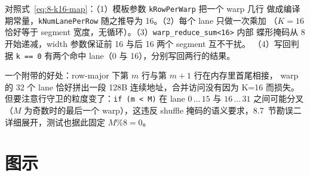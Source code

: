 

对照式~\ref{eq:8-k16-map}：（1）模板参数 \texttt{kRowPerWarp} 把一个 warp 几行
做成编译期常量，\texttt{k\allowbreak{}Num\allowbreak{}Lane\allowbreak{}Per\allowbreak{}Row} 随之推导为 16。（2）每个 lane 只做一次乘加
（$K=16$ 恰好等于 segment 宽度，无循环）。（3）\texttt{warp\_\allowbreak{}reduce\_\allowbreak{}sum\allowbreak{}<16>} 内部
蝶形掩码从 8 开始递减，width 参数保证前 16 与后 16 两个 segment 互不干扰。
（4）写回判据 \texttt{k == 0} 有两个命中 lane（0 与 16），分别写回两行的结果。

一个附带的好处：row-major 下第 $m$ 行与第 $m+1$ 行在内存里首尾相接，
warp 的 32 个 lane 恰好拼出一段 128B 连续地址，合并访问没有因为 K=16 而损失。
但要注意行守卫的粒度变了：\texttt{if (m < M)} 在 lane $0\,\dots\,15$ 与
$16\,\dots\,31$ 之间可能分叉（$M$ 为奇数时的最后一个 warp），这违反 shuffle
掩码的语义要求，8.7~节勘误二详细展开，测试也据此固定 $M \% 8 = 0$。

\needspace{92mm}

\section{图示}

